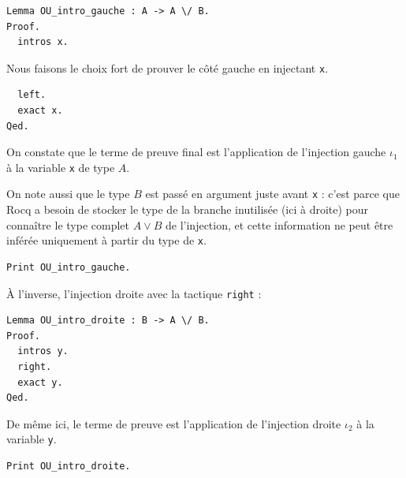 \documentclass[11pt,a4paper]{article}
\begin{document}
\begin{lstlisting}
Lemma OU_intro_gauche : A -> A \/ B.
Proof.
  intros x.
\end{lstlisting}

Nous faisons le choix fort de prouver le côté gauche en injectant \texttt{x}.

\begin{lstlisting}
  left.
  exact x.
Qed.
\end{lstlisting}

On constate que le terme de preuve final est l'application de l'injection gauche $\iota_1$ à la variable \texttt{x} de type $A$.

On note aussi que le type $B$ est passé en argument juste avant \texttt{x} : c'est parce que Rocq a besoin de stocker le type de la branche inutilisée (ici à droite) pour connaître le type complet $A \lor B$ de l'injection, et cette information ne peut être inférée uniquement à partir du type de \texttt{x}.

\begin{lstlisting}
Print OU_intro_gauche.
\end{lstlisting}

À l'inverse, l'injection droite avec la tactique \texttt{right} :

\begin{lstlisting}
Lemma OU_intro_droite : B -> A \/ B.
Proof.
  intros y.
  right.
  exact y.
Qed.
\end{lstlisting}

De même ici, le terme de preuve est l'application de l'injection droite $\iota_2$ à la variable \texttt{y}.

\begin{lstlisting}
Print OU_intro_droite.
\end{lstlisting}
\end{document}

